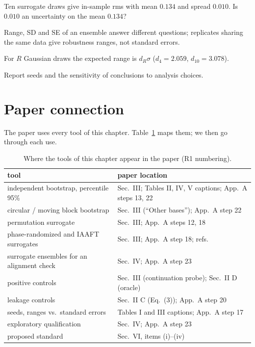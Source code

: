 \begin{checkpoint}
Ten surrogate draws give in-sample rms with mean $0.134$ and spread $0.010$. Is $0.010$ an uncertainty on the mean $0.134$?
\end{checkpoint}

\begin{keyideas}
\item Range, SD and SE of an ensemble answer different questions; replicates sharing the same data give robustness ranges, not standard errors.
\item For $R$ Gaussian draws the expected range is $d_R\sigma$ ($d_4=2.059$, $d_{10}=3.078$).
\item Report seeds and the sensitivity of conclusions to analysis choices.
\end{keyideas}

\section{Paper connection}\label{sec:controls-paper}

The paper \cite{soniR1} uses every tool of this chapter. Table~\ref{tab:controls-paper} maps them; we then go through each use.

\begin{table}[htbp]\centering
\caption{Where the tools of this chapter appear in the paper (R1 numbering).}\label{tab:controls-paper}
\begin{tabular}{ll}
\toprule
tool & paper location\\
\midrule
independent bootstrap, percentile 95\% & Sec.~III; Tables II, IV, V captions; App.~A steps 13, 22\\
circular / moving block bootstrap & Sec.~III (``Other bases''); App.~A step 22\\
permutation surrogate & Sec.~III; App.~A steps 12, 18\\
phase-randomized and IAAFT surrogates & Sec.~III; App.~A step 18; refs.~\cite{theiler,schreiber}\\
surrogate ensembles for an alignment check & Sec.~IV; App.~A step 23\\
positive controls & Sec.~III (continuation probe); Sec.~II D (oracle)\\
leakage controls & Sec.~II C (Eq.~(3)); App.~A step 20\\
seeds, ranges vs.\ standard errors & Tables I and III captions; App.~A step 17\\
exploratory qualification & Sec.~IV; App.~A step 23\\
proposed standard & Sec.~VI, items (i)--(iv)\\
\bottomrule
\end{tabular}
\end{table}

